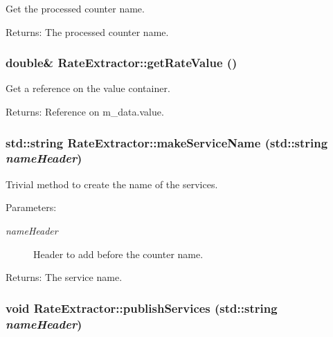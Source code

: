 Get the processed counter name. \begin{Desc}
\item[Returns:]The processed counter name. \end{Desc}
\subsubsection{\setlength{\rightskip}{0pt plus 5cm}double\& Rate\-Extractor::get\-Rate\-Value ()\hspace{0.3cm}{\tt  [inline]}}\label{classRateExtractor_a2}


Get a reference on the value container. \begin{Desc}
\item[Returns:]Reference on m\_\-data.value. \end{Desc}
\subsubsection{\setlength{\rightskip}{0pt plus 5cm}std::string Rate\-Extractor::make\-Service\-Name (std::string {\em name\-Header})\hspace{0.3cm}{\tt  [private]}}\label{classRateExtractor_d0}


Trivial method to create the name of the services.

\begin{Desc}
\item[Parameters:]
\begin{description}
\item[{\em name\-Header}]Header to add before the counter name.\end{description}
\end{Desc}
\begin{Desc}
\item[Returns:]The service name. \end{Desc}
\subsubsection{\setlength{\rightskip}{0pt plus 5cm}void Rate\-Extractor::publish\-Services (std::string {\em name\-Header})}\label{classRateExtractor_a6}


